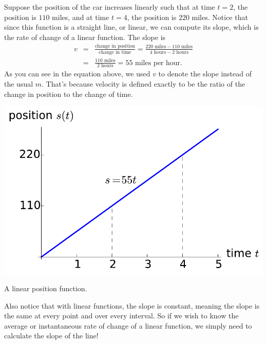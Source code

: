 Suppose the position of the car increases linearly such that at time $t=2$, the position is $110$ miles, and at time $t=4$, the position is $220$ miles.  Notice that since this function is a straight line, or linear, we can compute its slope, which is the rate of change of a linear function.  The slope is
\begin{eqnarray*}
v	& = & \frac{\mbox{change in position}}{\mbox{change in time}} = \frac{220 \mbox{ miles} - 110 \mbox{ miles}}{4 \mbox{ hours} - 2 \mbox{ hours}} \\
	& = & \frac{110 \mbox{ miles}}{2 \mbox{ hours}} = 55 \mbox{ miles per hour.}
\end{eqnarray*}
As you can see in the equation above, we used $v$ to denote the slope instead of the usual $m$.  That's because velocity is defined exactly to be the ratio of the change in position to the change of time.

\begin{marginfigure}[-2.5in] %
\includegraphics[width=\marginparwidth]{figs/0/linear_position_function.pdf}
\caption{A linear position function.}
\label{fig:0-linear_position_function}
\end{marginfigure}

Also notice that with linear functions, the slope is constant, meaning the slope is the same at every point and over every interval.  So if we wish to know the average or instantaneous rate of change of a linear function, we simply need to calculate the slope of the line!

